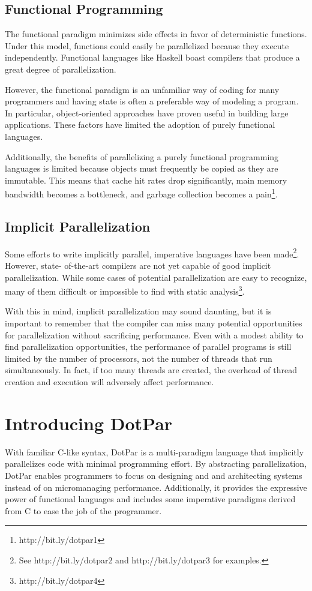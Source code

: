 \subsection{Functional Programming}
The functional paradigm minimizes side effects in favor of
deterministic functions. Under this model, functions could easily be
parallelized because they execute independently. Functional languages
like Haskell boast compilers that produce a great degree of
parallelization.

However, the functional paradigm is an unfamiliar way of coding for
many programmers and having state is often a preferable way of
modeling a program. In particular, object-oriented approaches have
proven useful in building large applications. These factors have
limited the adoption of purely functional languages.

Additionally, the benefits of parallelizing a purely functional
programming languages is limited because objects must frequently
be copied as they are immutable. This means that cache hit rates
drop significantly, main memory bandwidth becomes a bottleneck, and
garbage collection becomes a pain\footnote{http://bit.ly/dotpar1}.

\subsection{Implicit Parallelization}
Some efforts to write implicitly parallel, imperative languages have
been made\footnote{See http://bit.ly/dotpar2 and http://bit.ly/dotpar3
  for examples.}. However, state- of-the-art compilers are not yet
capable of good implicit parallelization. While some cases of
potential parallelization are easy to recognize, many of them
difficult or impossible to find with static
analysis\footnote{http://bit.ly/dotpar4}.

With this in mind, implicit parallelization may sound daunting, but it
is important to remember that the compiler can miss many potential
opportunities for parallelization without sacrificing
performance. Even with a modest ability to find parallelization
opportunities, the performance of parallel programs is still limited
by the number of processors, not the number of threads that run
simultaneously. In fact, if too many threads are created, the overhead
of thread creation and execution will adversely affect performance.

\section{Introducing DotPar}
With familiar C-like syntax, DotPar is a multi-paradigm language that
implicitly parallelizes code with minimal programming effort. By
abstracting parallelization, DotPar enables programmers to focus
on designing and and architecting systems instead of on micromanaging
performance. Additionally, it provides the expressive power of
functional languages and includes some imperative paradigms derived
from C to ease the job of the programmer.


